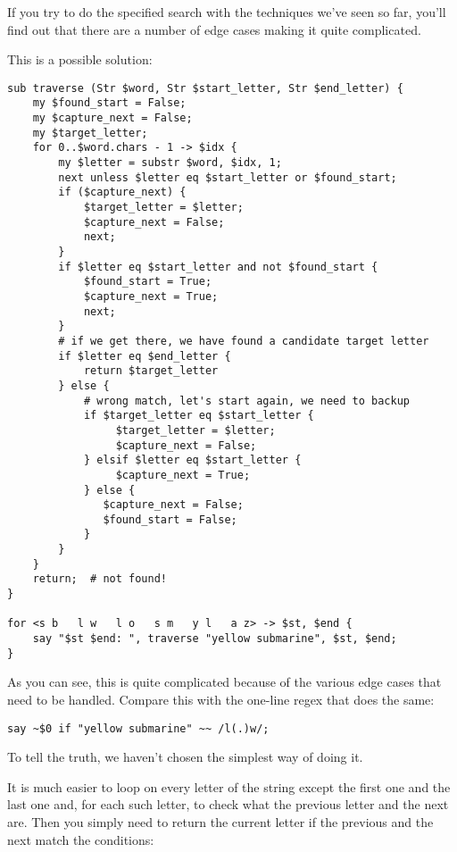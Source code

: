 If you try to do the specified search with the techniques 
we've seen so far, you'll find out that there are a number 
of edge cases making it quite complicated.

This is a possible solution:

\begin{verbatim}
sub traverse (Str $word, Str $start_letter, Str $end_letter) {
    my $found_start = False;
    my $capture_next = False;
    my $target_letter;
    for 0..$word.chars - 1 -> $idx {
        my $letter = substr $word, $idx, 1;
        next unless $letter eq $start_letter or $found_start;
        if ($capture_next) {
            $target_letter = $letter;
            $capture_next = False;
            next;
        }
        if $letter eq $start_letter and not $found_start {
            $found_start = True;
            $capture_next = True;
            next;
        }
        # if we get there, we have found a candidate target letter
        if $letter eq $end_letter {
            return $target_letter
        } else {
            # wrong match, let's start again, we need to backup
            if $target_letter eq $start_letter {
                 $target_letter = $letter;
                 $capture_next = False;
            } elsif $letter eq $start_letter {
                 $capture_next = True;
            } else {
               $capture_next = False;
               $found_start = False;
            } 
        } 
    }
    return;  # not found!
}          

for <s b   l w   l o   s m   y l   a z> -> $st, $end {
    say "$st $end: ", traverse "yellow submarine", $st, $end;  
}
\end{verbatim}

As you can see, this is quite complicated because of 
the various edge cases that need to be handled. Compare this with 
the one-line regex that does the same:

\begin{verbatim}
say ~$0 if "yellow submarine" ~~ /l(.)w/;
\end{verbatim}

To tell the truth, we haven't chosen the simplest way of 
doing it.

It is much easier to loop on every letter of the string 
except the first one and the last one and, for each such 
letter, to check what the previous letter and the next 
are. Then you simply need to return the current letter if 
the previous and the next match the conditions:

